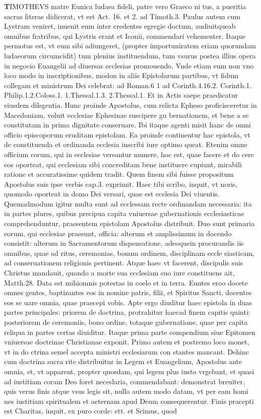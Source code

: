 \documentclass{article}
\begin{document}
\begin{pages}
\pstart \huge\textbf{T}\normalsize IMOTHEVS matre Eunica ludaea fideli, patre vero Graeco ni tus, a pueritia sacras literas didicerat, vt est Act. 16. et 2. ad Timoth.3. Paulus autem cum Lystram veniret, inuenit eum inter credentes egregie doctum, audiuitqueab omnibus fratribus, qui Lystris erant et Iconii, commendari vehementer. Itaque  permotus est, vt eum sibi adiungeret, (propter importuniratem eriam quorundam ludaeorum circumcidit) tum plenius instituendum, tum vsurus postea illius opera in negocio Euangelii ad diuersas ecclesias promouendo. Vnde etiam eum non vno loco modo in inscriptionibus, modon in aliis Epistolarum partibus, vt fidum collegam et ministrum Dei celebrat: ad Roman.6 1 ad Corinth.4.16.2. Corinth.1. Philip.1.2.Coloss.1. 1.Thessal.1.3. 2.Thessal.1. Et in Actis saepe praedicatur eiusdem dilsgentia. Hunc proinde Apostolus, cum relicta Epheso proficisceretur in Macedoniam, voluit ecclesiae Ephesinae suscipere gu bernationem, et bene a se constitutam in prima dignitate conseruare. Ibi itaque  agenti misit hanc de omni officio episcoporum eruditam epistolam. Ea proinde continentur hac epistola, vt de constituenda et ordinanda ecclesia inscribi iure optimo queat. Etenim omne officium corum, qui in ecclesiae versantur munere, hoc est, quae facere et do cere eos oporteat, qui ecclesiam sibi concreditam bene instituere cupiunt, mirabili ratione et accuratissime quidem tradit. Quem finem sibi fuisse propositum Apostolus suis ipse verbis cap.3. exprimit. Haec tibi scribo, inquit, vt noris, quomodo oporteat in domo Dei versari, quae est ecelesia Dei viuentis. Quemadmodum igitur multa sunt ad ecclessam recte ordinandam necessaria: ita in partes plures, quibus precipua capita vniuersae gubernationis ecclesiasticae comprehenduntur, praesentem epistolam Apostolus distribuit. Duo sunt primaria eorum, qui ecclesiae praesunt, officia: alterum et amplissimum in docendo consistit: alterum in Sacramentorum dispensatione, adeoquein procurandis iis omnibus, quae ad ritus, ceremonias, bonum ordinem, disciplinam eccle siasticam, ad conseruationem religionis pertinent. Atque  haec vt facerent, discipulis suis Christus mandauit, quando a morte sua ecclesiam suo iure constituens ait, Matth.28.  \pend\pstart Data est mihiomnis potestas in coelo et in terra. Euntes eroo docete omnes gentes, baptizantes eos in nomine patris, filii, et Spiritus Sancti, docentes eos se uare omnia, quae praecepi vobis. Apte ergo diuditur haec epistola in duas partes principales: priorem de doctrina, protrahitur haecad finem capitis quinti: posteriorem de ceremoniis, bono ordine, totaque  gubernatione, quae per capita reliqua in partes certas diuiditur. Itaque  prima parte compendium siue Epitomen vniuersae doctrinae Christianae exponit. Primo autem et postremo loco monet, vt in do ctrina semel accepta ministri ecclesiarum con stantes mancant. Dehinc cum doctrina sacra rite distribuitur in Legem et Euangelium, Apostolus ante omnia, et, vt apparent, propter quosdam, qui legem plus iusto vrgebant, et quasi ad iustitiam coram Deo foret neceslaria, commendabant: demonstrat breuiter, quis verus finis atque  vsus legis sit, nullo autem modo datam, vt per eam homi nes iustitiam spiritualem et aeternam apud Deum consequerentur. Finis pracepti est Charitas, inquit, ex puro corde: ett. et Scimus, quod 
\end{pages}
\end{document}
